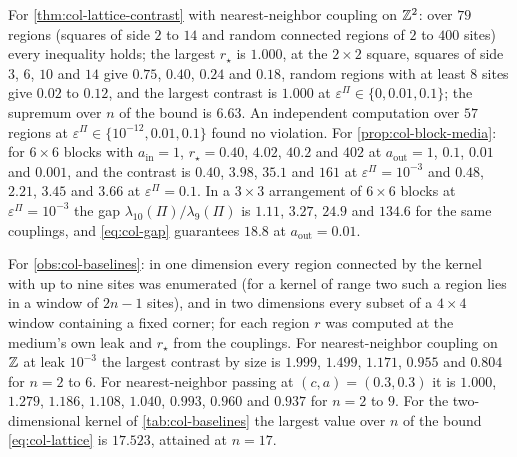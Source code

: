 \begin{numcheck}\label{chk:col-lattice}
For \cref{thm:col-lattice-contrast} with nearest-neighbor coupling on $\mathbb{Z}^2$: over $79$ regions (squares of side $2$ to $14$ and random connected regions of $2$ to $400$ sites) every inequality holds; the largest $r_\star$ is $1.000$, at the $2\times2$ square, squares of side $3$, $6$, $10$ and $14$ give $0.75$, $0.40$, $0.24$ and $0.18$, random regions with at least $8$ sites give $0.02$ to $0.12$, and the largest contrast is $1.000$ at $\varepsilon^\Pi\in\{0,0.01,0.1\}$; the supremum over $n$ of the bound is $6.63$. An independent computation over $57$ regions at $\varepsilon^\Pi\in\{10^{-12},0.01,0.1\}$ found no violation. For \cref{prop:col-block-media}: for $6\times6$ blocks with $a_{\mathrm{in}}=1$, $r_\star=0.40$, $4.02$, $40.2$ and $402$ at $a_{\mathrm{out}}=1$, $0.1$, $0.01$ and $0.001$, and the contrast is $0.40$, $3.98$, $35.1$ and $161$ at $\varepsilon^\Pi=10^{-3}$ and $0.48$, $2.21$, $3.45$ and $3.66$ at $\varepsilon^\Pi=0.1$. In a $3\times3$ arrangement of $6\times6$ blocks at $\varepsilon^\Pi=10^{-3}$ the gap $\lambda_{10}(\Pi)/\lambda_9(\Pi)$ is $1.11$, $3.27$, $24.9$ and $134.6$ for the same couplings, and \eqref{eq:col-gap} guarantees $18.8$ at $a_{\mathrm{out}}=0.01$.
\end{numcheck}

\begin{numcheck}\label{chk:col-baselines}
For \cref{obs:col-baselines}: in one dimension every region connected by the kernel with up to nine sites was enumerated (for a kernel of range two such a region lies in a window of $2n-1$ sites), and in two dimensions every subset of a $4\times4$ window containing a fixed corner; for each region $r$ was computed at the medium's own leak and $r_\star$ from the couplings. For nearest-neighbor coupling on $\mathbb{Z}$ at leak $10^{-3}$ the largest contrast by size is $1.999$, $1.499$, $1.171$, $0.955$ and $0.804$ for $n=2$ to $6$. For nearest-neighbor passing at $(c,a)=(0.3,0.3)$ it is $1.000$, $1.279$, $1.186$, $1.108$, $1.040$, $0.993$, $0.960$ and $0.937$ for $n=2$ to $9$. For the two-dimensional kernel of \cref{tab:col-baselines} the largest value over $n$ of the bound \eqref{eq:col-lattice} is $17.523$, attained at $n=17$.
\end{numcheck}

